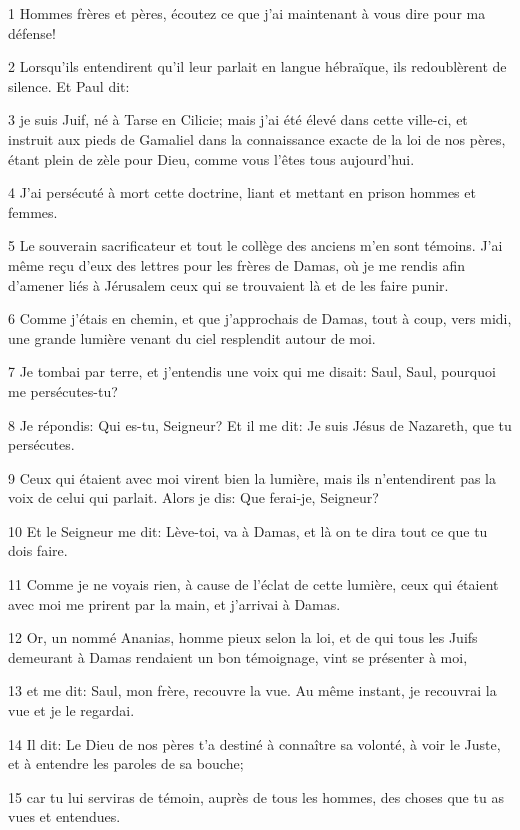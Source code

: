 \par 1 Hommes frères et pères, écoutez ce que j'ai maintenant à vous dire pour ma défense!
\par 2 Lorsqu'ils entendirent qu'il leur parlait en langue hébraïque, ils redoublèrent de silence. Et Paul dit:
\par 3 je suis Juif, né à Tarse en Cilicie; mais j'ai été élevé dans cette ville-ci, et instruit aux pieds de Gamaliel dans la connaissance exacte de la loi de nos pères, étant plein de zèle pour Dieu, comme vous l'êtes tous aujourd'hui.
\par 4 J'ai persécuté à mort cette doctrine, liant et mettant en prison hommes et femmes.
\par 5 Le souverain sacrificateur et tout le collège des anciens m'en sont témoins. J'ai même reçu d'eux des lettres pour les frères de Damas, où je me rendis afin d'amener liés à Jérusalem ceux qui se trouvaient là et de les faire punir.
\par 6 Comme j'étais en chemin, et que j'approchais de Damas, tout à coup, vers midi, une grande lumière venant du ciel resplendit autour de moi.
\par 7 Je tombai par terre, et j'entendis une voix qui me disait: Saul, Saul, pourquoi me persécutes-tu?
\par 8 Je répondis: Qui es-tu, Seigneur? Et il me dit: Je suis Jésus de Nazareth, que tu persécutes.
\par 9 Ceux qui étaient avec moi virent bien la lumière, mais ils n'entendirent pas la voix de celui qui parlait. Alors je dis: Que ferai-je, Seigneur?
\par 10 Et le Seigneur me dit: Lève-toi, va à Damas, et là on te dira tout ce que tu dois faire.
\par 11 Comme je ne voyais rien, à cause de l'éclat de cette lumière, ceux qui étaient avec moi me prirent par la main, et j'arrivai à Damas.
\par 12 Or, un nommé Ananias, homme pieux selon la loi, et de qui tous les Juifs demeurant à Damas rendaient un bon témoignage, vint se présenter à moi,
\par 13 et me dit: Saul, mon frère, recouvre la vue. Au même instant, je recouvrai la vue et je le regardai.
\par 14 Il dit: Le Dieu de nos pères t'a destiné à connaître sa volonté, à voir le Juste, et à entendre les paroles de sa bouche;
\par 15 car tu lui serviras de témoin, auprès de tous les hommes, des choses que tu as vues et entendues.
